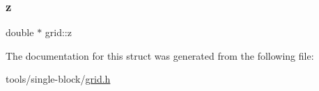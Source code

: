 \mbox{\label{structgrid_a4c2b018b3e10df621befcf7099b3ba6d}} 
\subsubsection{\texorpdfstring{z}{z}}
{\footnotesize\ttfamily double $\ast$ grid\+::z}



The documentation for this struct was generated from the following file\+:\begin{DoxyCompactItemize}
\item 
tools/single-\/block/\mbox{\hyperlink{grid_8h}{grid.\+h}}\end{DoxyCompactItemize}
